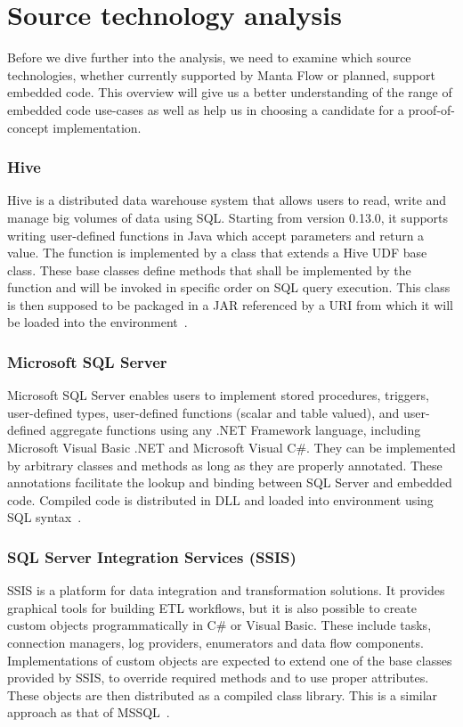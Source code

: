 \section{Source technology analysis}

Before we dive further into the analysis, we need to examine which source technologies, whether currently supported by Manta Flow or planned, support embedded code. This overview will give us a better understanding of the range of embedded code use-cases as well as help us in choosing a candidate for a proof-of-concept implementation.

\subsubsection{Hive}
Hive is a distributed data warehouse system that allows users to read, write and manage big volumes of data using SQL. Starting from version 0.13.0, it supports writing user-defined functions in Java which accept parameters and return a value. The function is implemented by a class that extends a Hive UDF base class. These base classes define methods that shall be implemented by the function and will be invoked in specific order on SQL query execution. This class is then supposed to be packaged in a JAR referenced by a URI from which it will be loaded into the environment~\cite{hive}.

\subsubsection{Microsoft SQL Server}
Microsoft SQL Server enables users to implement stored procedures, triggers, user-defined types, user-defined functions (scalar and table valued), and user-defined aggregate functions using any .NET Framework language, including Microsoft Visual Basic .NET and Microsoft Visual C\#. They can be implemented by arbitrary classes and methods as long as they are properly annotated. These annotations facilitate the lookup and binding between SQL Server and embedded code. Compiled code is distributed in DLL and loaded into environment using SQL syntax~\cite{mssql}.

\subsubsection{SQL Server Integration Services (SSIS)}
SSIS is a platform for data integration and transformation solutions. It provides graphical tools for building ETL workflows, but it is also possible to create custom objects programmatically in C\# or Visual Basic. These include tasks, connection managers, log providers, enumerators and data flow components. Implementations of custom objects are expected to extend one of the base classes provided by SSIS, to override required methods and to use proper attributes. These objects are then distributed as a compiled class library. This is a similar approach as that of MSSQL~\cite{ssis}.

